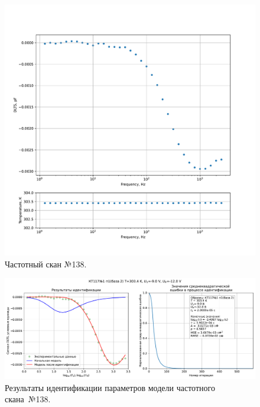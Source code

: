 \begin{figure}[!ht]
    \centering
    \includegraphics[width=1\textwidth]{../plots/КТ117№1_п1(база 2)_2500Гц-1Гц_1пФ_+30С_-9В-12В_50мВ_20мкс_шаг_0,1.pdf}
    \caption{Частотный скан №138.}
    \label{pic:frequency_scan_138}
\end{figure}

\begin{figure}[!ht]
    \centering
    \includegraphics[width=1\textwidth]{../plots/КТ117№1_п1(база 2)_2500Гц-1Гц_1пФ_+30С_-9В-12В_50мВ_20мкс_шаг_0,1_model.pdf}
    \caption{Результаты идентификации параметров модели частотного скана~№138.}
    \label{pic:frequency_scan_model138}
\end{figure}

\pagebreak


